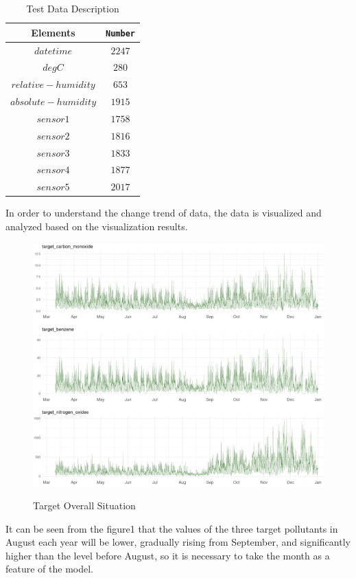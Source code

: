\begin{table}[H]  \centering
	\caption{Test Data Description}
	\label{tbl:Test Data Description}
	\begin{tabular}{c| c }
		\toprule
		Elements & \texttt{Number}  \\
		\midrule
		$date time$
		&  {$2247$} \\
		$deg C$
		&  {$280$} \\
		$relative-humidity$
		&  {$653$}  \\
		$absolute-humidity$
		&  {$1915$}  \\
		$sensor 1$
		&  {$1758$} \\
		$sensor 2$
		&  {$1816$} \\
		$sensor 3$
		&  {$1833$} \\
		$sensor 4$
		&  {$1877$} \\
		$sensor 5$
		&  {$2017$} \\
		\bottomrule
	\end{tabular}
\end{table}

In order to understand the change trend of data, the data is visualized and analyzed based on the visualization results.

\begin{figure}[H]
	\centering
	\includegraphics[scale=0.3]{figures//p1.eps}\\
	\caption{Target Overall Situation}\label{fig:Target Overall Situation}
\end{figure}
It can be seen from the figure1 that the values of the three target pollutants in August each year will be lower, 
gradually rising from September, and significantly higher than the level before August, 
so it is necessary to take the month as a feature of the model. 

